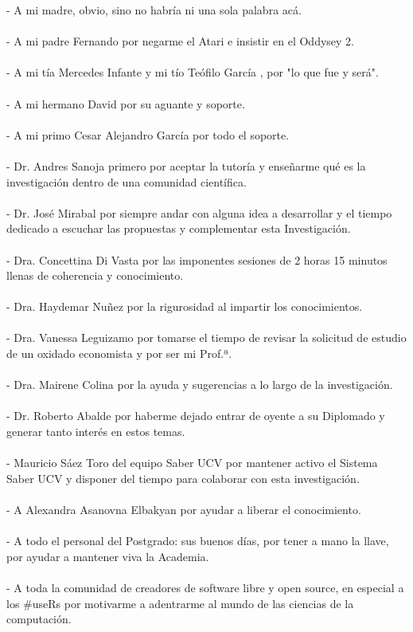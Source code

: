 - A mi madre, obvio, sino no habría ni una sola palabra acá.\\\\
- A mi padre Fernando por negarme el Atari e insistir en el Oddysey 2.\\\\
- A mi tía Mercedes Infante y mi tío Teófilo García \textdagger, por "lo que fue y será".\\\\
- A mi hermano David por su aguante y soporte.\\\\
- A mi primo Cesar Alejandro García por todo el soporte.\\\\
- Dr. Andres Sanoja primero por aceptar la tutoría y enseñarme qué es la investigación dentro de una comunidad científica.\\\\
- Dr. José Mirabal por siempre andar con alguna idea a desarrollar y el tiempo dedicado a escuchar las propuestas y complementar esta Investigación.\\\\
- Dra. Concettina Di Vasta por las imponentes sesiones de 2 horas 15 minutos llenas de coherencia y conocimiento.\\\\
- Dra. Haydemar Nuñez por la rigurosidad al impartir los conocimientos.\\\\
- Dra. Vanessa Leguizamo por tomarse el tiempo de revisar la solicitud de estudio de un oxidado economista y por ser mi Prof.ª.\\\\
- Dra. Mairene Colina por la ayuda y sugerencias a lo largo de la investigación.\\\\
- Dr. Roberto Abalde por haberme dejado entrar de oyente a su Diplomado y generar tanto interés en estos temas.\\\\
- Mauricio Sáez Toro del equipo Saber UCV por mantener activo el Sistema Saber UCV y disponer del tiempo para colaborar con esta investigación.\\\\
- A Alexandra Asanovna Elbakyan por ayudar a liberar el conocimiento.\\\\
- A todo el personal del Postgrado: sus buenos días, por tener a mano la llave, por ayudar a mantener viva la Academia.\\\\
- A toda la comunidad de creadores de software libre y open source, en especial a los \#useRs por motivarme a adentrarme al mundo de las ciencias de la computación.\\\\


